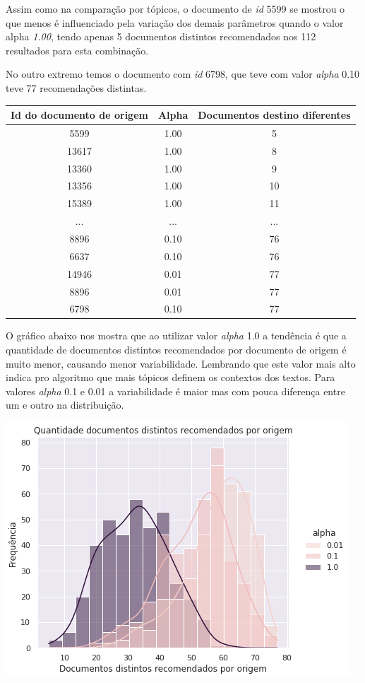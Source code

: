 Assim como na comparação por tópicos, o documento de \textit{id} 5599 se mostrou o que menos é influenciado pela variação dos demais 
parâmetros quando o valor alpha \textit{1.00}, tendo apenas 5 documentos distintos recomendados nos 112 resultados para esta combinação.

No outro extremo temos o documento com \textit{id} 6798, que teve com valor \textit{alpha} 0.10 teve 77 recomendações distintas.

\begin{center}
    \begin{tabular}{|c|c|c|}
        \hline
        Id do documento de origem & Alpha & Documentos destino diferentes \\
        \hline
        5599 & 1.00 & 5 \\
        \hline
        13617 & 1.00 & 8 \\
        \hline
        13360 & 1.00 & 9 \\
        \hline
        13356 & 1.00 & 10 \\
        \hline
        15389 & 1.00 & 11 \\
        \hline
        ... & ... & ... \\
        \hline
        8896 & 0.10 & 76 \\
        \hline
        6637 & 0.10 & 76 \\
        \hline
        14946 & 0.01 & 77 \\
        \hline
        8896 & 0.01 & 77 \\
        \hline
        6798 & 0.10 & 77 \\
        \hline
    \end{tabular}
\end{center}

O gráfico abaixo nos mostra que ao utilizar valor \textit{alpha} 1.0 a tendência é que a quantidade de documentos distintos recomendados por 
documento de origem é muito menor, causando menor variabilidade. Lembrando que este valor mais alto indica pro algoritmo que mais tópicos definem 
os contextos dos textos. Para valores \textit{alpha} 0.1 e 0.01 a variabilidade é maior mas com pouca diferença entre um e outro na distribuição.

\includegraphics[scale=0.7]{resultados/resources/distribuicao_semelhantes_distintos_alpha.png}

